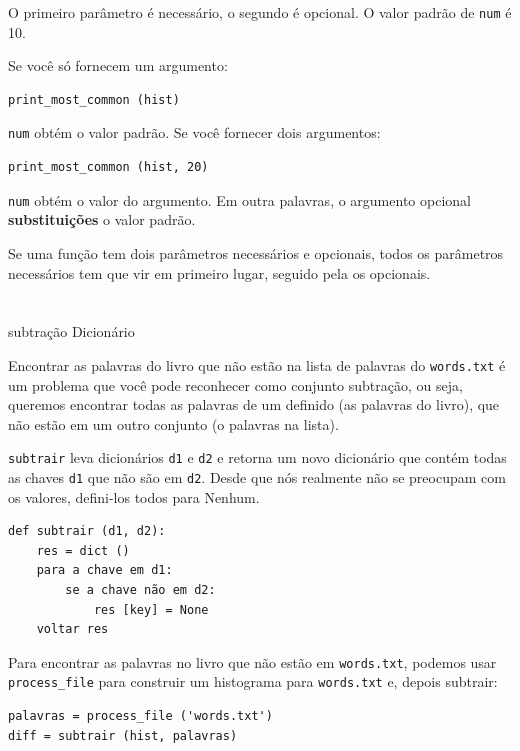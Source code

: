 \documentclass[10pt]{book}
\begin{document}
\begin{exercise}
\begin{v erbatim}
O primeiro parâmetro é necessário, o segundo é opcional.
O valor padrão {\bf} de {\tt num} é 10.

Se você só fornecem um argumento:

\begin{verbatim}
print_most_common (hist)
\end{verbatim}

{\tt num} obtém o valor padrão. Se você fornecer dois argumentos:

\begin{verbatim}
print_most_common (hist, 20)
\end{verbatim}

{\tt num} obtém o valor do argumento. Em outra
palavras, o argumento opcional {\bf substituições} o valor padrão.

Se uma função tem dois parâmetros necessários e opcionais, todos
os parâmetros necessários tem que vir em primeiro lugar, seguido pela
os opcionais.


\section{} subtração Dicionário

Encontrar as palavras do livro que não estão na lista de palavras
do {\tt words.txt} é um problema que você pode reconhecer como conjunto
subtração, ou seja, queremos encontrar todas as palavras de um
definido (as palavras do livro), que não estão em um outro conjunto (o
palavras na lista).

{\tt subtrair} leva dicionários {\tt d1} e {\tt d2} e retorna um
novo dicionário que contém todas as chaves {\tt d1} que não são
em {\tt d2}. Desde que nós realmente não se preocupam com os valores,
defini-los todos para Nenhum.

\begin{verbatim}
def subtrair (d1, d2):
    res = dict ()
    para a chave em d1:
        se a chave não em d2:
            res [key] = None
    voltar res
\end{verbatim}
%
Para encontrar as palavras no livro que não estão em {\tt words.txt},
podemos usar \verb "process_file" para construir um histograma para
{\tt words.txt} e, depois subtrair:

\begin{verbatim}
palavras = process_file ('words.txt')
diff = subtrair (hist, palavras)


\end{verbatim}
\end{v erbatim}
\end{exercise}
\end{document}

